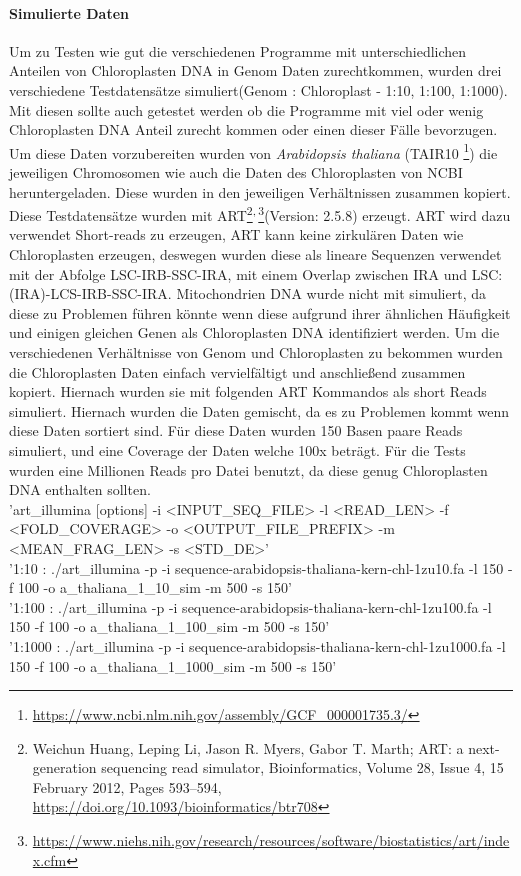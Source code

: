 \documentclass{scrartcl}
\begin{document}
\paragraph{Simulierte Daten}
\label{sec-3-1-1-1}
Um zu Testen wie gut die verschiedenen Programme mit unterschiedlichen Anteilen von Chloroplasten DNA in
Genom Daten zurechtkommen, wurden drei verschiedene Testdatensätze simuliert(Genom : Chloroplast - 1:10, 1:100, 1:1000). 
Mit diesen sollte auch getestet werden ob die Programme mit viel oder wenig Chloroplasten DNA Anteil zurecht kommen oder einen dieser Fälle 
bevorzugen. Um diese Daten vorzubereiten wurden von \emph{Arabidopsis thaliana} (TAIR10 \footnote{\url{https://www.ncbi.nlm.nih.gov/assembly/GCF_000001735.3/}}) die jeweiligen Chromosomen wie auch die Daten
des Chloroplasten von NCBI heruntergeladen. Diese wurden in den jeweiligen Verhältnissen zusammen kopiert.
Diese Testdatensätze wurden mit ART\footnote{Weichun Huang, Leping Li, Jason R. Myers, Gabor T. Marth; ART: a next-generation sequencing read simulator, Bioinformatics, Volume 28, Issue 4, 15 February 2012, Pages 593–594, \url{https://doi.org/10.1093/bioinformatics/btr708}}\textsuperscript{,}\,\footnote{\url{https://www.niehs.nih.gov/research/resources/software/biostatistics/art/index.cfm}}(Version: 2.5.8) erzeugt. ART wird dazu verwendet Short-reads zu erzeugen, ART kann keine zirkulären Daten wie Chloroplasten 
erzeugen, deswegen wurden diese als lineare Sequenzen verwendet mit der Abfolge LSC-IRB-SSC-IRA, mit einem Overlap zwischen IRA und LSC: (IRA)-LCS-IRB-SSC-IRA. 
Mitochondrien DNA wurde nicht mit simuliert, da diese zu 
Problemen führen könnte wenn diese aufgrund ihrer ähnlichen Häufigkeit und einigen gleichen Genen als Chloroplasten DNA identifiziert werden. 
Um die verschiedenen Verhältnisse von Genom und Chloroplasten zu bekommen wurden die Chloroplasten Daten einfach
vervielfältigt und anschließend zusammen kopiert. Hiernach wurden sie mit folgenden ART Kommandos als short Reads simuliert.
Hiernach wurden die Daten gemischt, da es zu Problemen kommt wenn diese Daten sortiert sind. Für diese Daten wurden 150 Basen paare Reads simuliert, 
und eine Coverage der Daten welche 100x beträgt. 
Für die Tests wurden eine Millionen Reads pro Datei benutzt, da diese genug Chloroplasten DNA enthalten sollten.
\\
'art\_illumina [options] -i <INPUT\_SEQ\_FILE> -l <READ\_LEN> -f <FOLD\_COVERAGE> -o <OUTPUT\_FILE\_PREFIX> -m <MEAN\_FRAG\_LEN> -s <STD\_DE>'
\\
'1:10 : ./art\_illumina -p -i sequence-arabidopsis-thaliana-kern-chl-1zu10.fa -l 150 -f 100 -o a\_thaliana\_1\_10\_sim -m 500 -s 150'
\\
'1:100 :  ./art\_illumina -p -i sequence-arabidopsis-thaliana-kern-chl-1zu100.fa -l 150 -f 100 -o a\_thaliana\_1\_100\_sim -m 500 -s 150'
\\
'1:1000 :  ./art\_illumina -p -i sequence-arabidopsis-thaliana-kern-chl-1zu1000.fa -l 150 -f 100 -o a\_thaliana\_1\_1000\_sim -m 500 -s 150'
\end{document}
